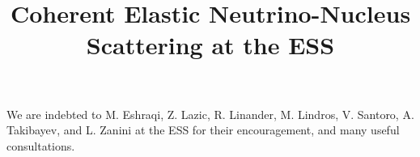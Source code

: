 \documentclass[a4paper,11pt]{article}
\begin{document}
\title{Coherent Elastic Neutrino-Nucleus Scattering  at the ESS \\ }





\notoctrue
\maketitle
\flushbottom
\notoc





\clearpage

\acknowledgments
We are indebted to M. Eshraqi, Z. Lazic, R. Linander, M. Lindros, V. Santoro, A. Takibayev, and L. Zanini at the ESS for their encouragement, and many useful consultations. 

%
%

\end{document}
